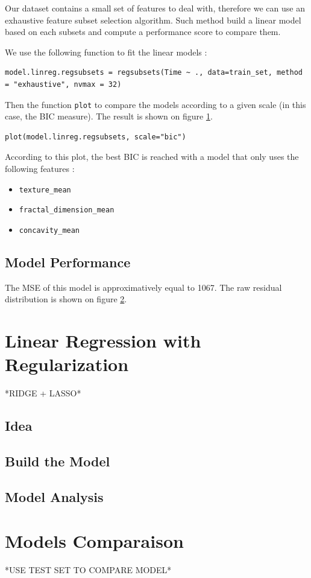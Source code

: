 \documentclass[]{report}
\begin{document}
Our dataset contains a small set of features to deal with, therefore we can use an exhaustive feature subset selection algorithm. Such method build a linear model based on each subsets and compute a performance score to compare them. 

We use the following function to fit the linear models :
\begin{lstlisting}
model.linreg.regsubsets = regsubsets(Time ~ ., data=train_set, method = "exhaustive", nvmax = 32)
\end{lstlisting}

Then the function \texttt{plot} to compare the models according to a given scale (in this case, the BIC measure). The result is shown on figure \ref{fig:subset_bic}.
\begin{lstlisting}
plot(model.linreg.regsubsets, scale="bic")	
\end{lstlisting}

\begin{figure}[!h]
	\centering
	
	\caption{}
	\label{fig:subset_bic}
\end{figure}

According to this plot, the best BIC is reached with a model that only uses the following features : 
\begin{itemize}
	\item \texttt{texture\_mean}
	\item \texttt{fractal\_dimension\_mean}
	\item \texttt{concavity\_mean}
\end{itemize}

\subsection{Model Performance}
The MSE of this model is approximatively equal to 1067. The raw residual distribution is shown on figure \ref{fig:subset_hist}. 

\begin{figure}[!h]
	\centering
	
	\caption{}
	\label{fig:subset_hist}
\end{figure}

\section{Linear Regression with Regularization}

*RIDGE + LASSO*
\subsection{Idea}

\subsection{Build the Model}

\subsection{Model Analysis}



\section{Models Comparaison}

*USE TEST SET TO COMPARE MODEL*
\end{document}
